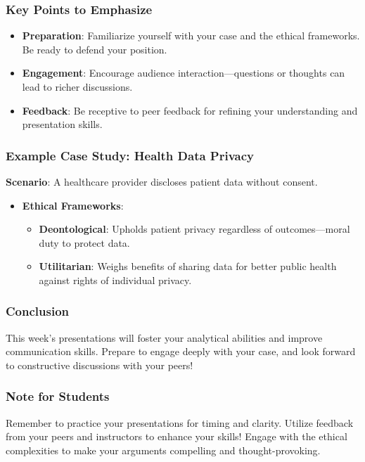 \documentclass[aspectratio=169]{beamer}
\begin{document}
\begin{frame}[fragile]
    \frametitle{Key Points to Emphasize}
    \begin{itemize}
        \item \textbf{Preparation}: Familiarize yourself with your case and the ethical frameworks. Be ready to defend your position.
        \item \textbf{Engagement}: Encourage audience interaction—questions or thoughts can lead to richer discussions.
        \item \textbf{Feedback}: Be receptive to peer feedback for refining your understanding and presentation skills.
    \end{itemize}
\end{frame}

\begin{frame}[fragile]
    \frametitle{Example Case Study: Health Data Privacy}
    \textbf{Scenario}: A healthcare provider discloses patient data without consent.
    
    \begin{itemize}
        \item \textbf{Ethical Frameworks}:
        \begin{itemize}
            \item \textbf{Deontological}: Upholds patient privacy regardless of outcomes—moral duty to protect data.
            \item \textbf{Utilitarian}: Weighs benefits of sharing data for better public health against rights of individual privacy.
        \end{itemize}
    \end{itemize}
\end{frame}

\begin{frame}[fragile]
    \frametitle{Conclusion}
    This week’s presentations will foster your analytical abilities and improve communication skills. Prepare to engage deeply with your case, and look forward to constructive discussions with your peers!
\end{frame}

\begin{frame}[fragile]
    \frametitle{Note for Students}
    Remember to practice your presentations for timing and clarity. Utilize feedback from your peers and instructors to enhance your skills! Engage with the ethical complexities to make your arguments compelling and thought-provoking.
\end{frame}
\end{document}
